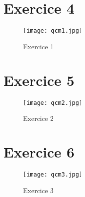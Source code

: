 \documentclass[a4paper,12pt]{article}
\begin{document}
\section{Exercice 4}

\begin{figure}[H]
  \centering
  \texttt{[image: qcm1.jpg]}
  \caption{\label{} Exercice 1}
\end{figure}

\section{Exercice 5}

\begin{figure}[H]
  \centering
  \texttt{[image: qcm2.jpg]}
  \caption{\label{} Exercice 2}
\end{figure}

\section{Exercice 6}

\begin{figure}[H]
  \centering
  \texttt{[image: qcm3.jpg]}
  \caption{\label{} Exercice 3}
\end{figure}
\end{document}

